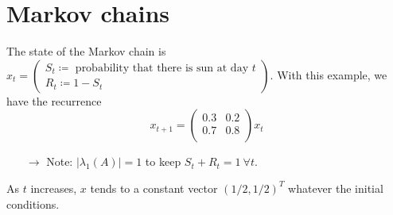 \documentclass[12pt, openany]{report}
\theoremstyle{definition}
\begin{document}
\section{Markov chains}
\begin{center}
\end{center}
The state of the Markov chain is $x_t = \begin{pmatrix}S_t\coloneqq \text{ probability that there is sun at day } t\\ R_t \coloneqq 1-S_t \end{pmatrix}$. With this example, we have the recurrence 
\begin{equation}
    x_{t+1} = \begin{pmatrix}
        0.3 & 0.2\\
        0.7 & 0.8\\
    \end{pmatrix} x_t
\end{equation}
\begin{itemize}
    \item [$\rightarrow$] Note: $|\lambda_1(A)| = 1$ to keep $S_t+R_t = 1 \: \forall t$. 
\end{itemize}
As $t$ increases, $x$ tends to a constant vector $(1/2, 1/2)^T$ whatever the initial conditions. 
\end{document}
